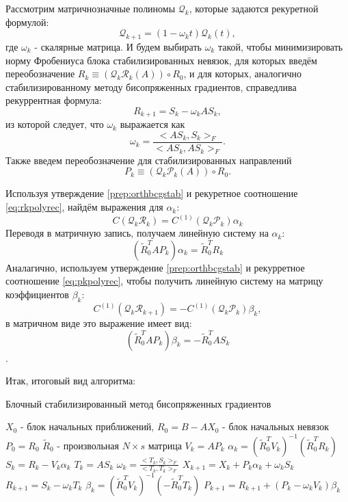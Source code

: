 Рассмотрим матричнозначные полиномы $\mathcal{Q}_k$, которые задаются рекуретной формулой:
\begin{equation*}
    \mathcal{Q}_{k+1} = (1-\omega_k t)\mathcal{Q}_k(t),
\end{equation*}
где $\omega_k$ - скалярные матрица. И будем выбирать $\omega_k$ такой, чтобы минимизировать норму 
Фробениуса блока стабилизированных невязок, для которых введём переобозначение $R_{k} \equiv (\mathcal{Q}_k\mathcal{R}_k(A)) \circ R_0$, и для которых, аналогично стабилизированному методу бисопряженных градиентов, справедлива рекуррентная формула:
$$R_{k+1} =  S_k - \omega_k A S_k,$$
из которой следует, что $\omega_k$ выражается как
 $$\omega_k = \frac{<AS_k,S_k>_F}{<AS_k,AS_k>_F}.$$
Также введем переобозначение для стабилизированных направлений 
$$P_k \equiv (\mathcal{Q}_k \mathcal{P}_k (A)) \circ R_0.$$


Используя утверждение \ref{prep:orthbcgstab} и рекуретное соотношение \eqref{eq:rkpolyrec}, 
найдём выражения для $\alpha_k$:
$$C(\mathcal{Q}_k \mathcal{R}_k) = C^{(1)}(\mathcal{Q}_k\mathcal{P}_k)\alpha_k $$
Переводя в матричную запись, получаем линейную систему на $\alpha_k$:
$$(\tilde{R}_0^T AP_k)\alpha_k = \tilde{R}_0^TR_k$$
Аналагично, используем утверждение \ref{prep:orthbcgstab} и рекурретное соотношение \eqref{eq:pkpolyrec}, чтобы получить линейную систему на матрицу коэффициентов $\beta_k$:
$$C^{(1)}(\mathcal{Q}_k\mathcal{R}_{k+1}) = - C^{(1)}(\mathcal{Q}_k \mathcal{P}_k)\beta_k,$$
в матричном виде это выражение имеет вид:
$$(\tilde{R}_0^T A P_k)\beta_k=-\tilde{R}_0^T A S_k$$.

Итак, итоговый вид алгоритма:
\begin{algorithm}[H]
    \caption{Блочный стабилизированный метод бисопряженных градиентов}
    \begin{algorithmic}[1]
        \State $X_0$ - блок начальных приближений, $R_0 = B - AX_0$ - блок начальных невязок
        \State $P_0 = R_0$
        \State $\tilde{R}_0$ - произвольная $N \times s$ матрица
            \State $V_k = AP_k$
            \State $\alpha_k = (\tilde{R}_0^TV_k)^{-1}(\tilde{R}_0^T R_k)$
            \State $S_k = R_k - V_k \alpha_k$
            \State $T_k = A S_k$
            \State $\omega_k = \frac{<T_k,S_k>_F}{<T_k,T_k>_F}$
            \State $X_{k+1} = X_k + P_k \alpha_k + \omega_k S_k$
            \State $R_{k+1} = S_{k} - \omega_k T_k$
            \State $\beta_k = (\tilde{R}_0^T V_k)^{-1}(-\tilde{R}_0^T T_k)$
            \State $P_{k+1} = R_{k+1} + (P_k-\omega_kV_k)\beta_k$
        \EndFor
    \end{algorithmic}
\end{algorithm}


